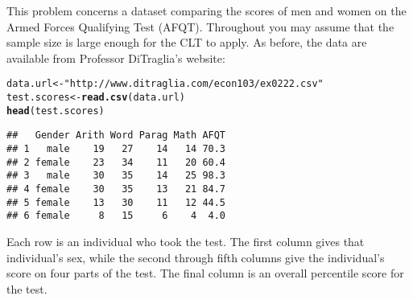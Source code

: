 \documentclass[addpoints,12pt]{exam}\usepackage[]{graphicx}\usepackage[]{color}
\makeatletter
\newcommand{\hlstr}[1]{\textcolor[rgb]{0.192,0.494,0.8}{#1}}%
\newcommand{\hlstd}[1]{\textcolor[rgb]{0.345,0.345,0.345}{#1}}%
\newcommand{\hlkwb}[1]{\textcolor[rgb]{0.69,0.353,0.396}{#1}}%
\newcommand{\hlkwd}[1]{\textcolor[rgb]{0.737,0.353,0.396}{\textbf{#1}}}%
\newenvironment{kframe}{%
 \def\at@end@of@kframe{}%
 \ifinner\ifhmode%
  \def\at@end@of@kframe{\end{minipage}}%
  \begin{minipage}{\columnwidth}%
 \fi\fi%
 \def\FrameCommand##1{\hskip\@totalleftmargin \hskip-\fboxsep
 \colorbox{shadecolor}{##1}\hskip-\fboxsep
     \hskip-\linewidth \hskip-\@totalleftmargin \hskip\columnwidth}%
 \MakeFramed {\advance\hsize-\width
   \@totalleftmargin\z@ \linewidth\hsize
   \@setminipage}}%
 {\par\unskip\endMakeFramed%
 \at@end@of@kframe}
\newenvironment{knitrout}{}{} %
\makeatother
\begin{document}
\begin{questions}
\question This problem concerns a dataset comparing the scores of men and women on the Armed Forces Qualifying Test (AFQT). Throughout you may assume that the sample size is large enough for the CLT to apply. As before, the data are available from Professor DiTraglia's website:
\begin{knitrout}
\color{fgcolor}\begin{kframe}
\begin{alltt}
\hlstd{data.url} \hlkwb{<-} \hlstr{"http://www.ditraglia.com/econ103/ex0222.csv"}
\hlstd{test.scores} \hlkwb{<-} \hlkwd{read.csv}\hlstd{(data.url)}
\hlkwd{head}\hlstd{(test.scores)}
\end{alltt}
\begin{verbatim}
##   Gender Arith Word Parag Math AFQT
## 1   male    19   27    14   14 70.3
## 2 female    23   34    11   20 60.4
## 3   male    30   35    14   25 98.3
## 4 female    30   35    13   21 84.7
## 5 female    13   30    11   12 44.5
## 6 female     8   15     6    4  4.0
\end{verbatim}
\end{kframe}
\end{knitrout}
Each row is an individual who took the test. The first column gives that individual's sex, while the second through fifth columns give the individual's score on four parts of the test. The final column is an overall percentile score for the test. 
	\begin{parts}

\end{parts}
\end{questions}
\end{document}
